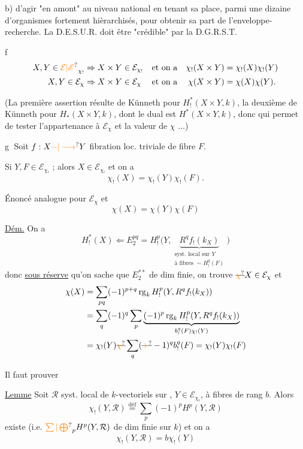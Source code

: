 b) d'agir "en amont" au niveau national en tenant sa place, parmi une dizaine d'organismes fortement hièrarchisés, pour obtenir sa part de l'enveloppe-recherche. La D.E.S.U.R. doit être "crédible" par la D.G.R.S.T.



\textcircled{f}
\[
\begin{aligned}
X,Y\in\unsure{\mathcal E|\mathscr E}_{\chi_!}&\Rightarrow X\times Y\in\mathcal E_{\chi_!} &&\text{et on a} &\chi_!(X\times Y)&=\chi_!(X)\chi_!(Y)\\
X,Y\in\mathcal E_\chi&\Rightarrow X\times Y\in\mathcal E_\chi &&\text{et on a} &\chi(X\times Y)&=\chi(X)\chi(Y).
\end{aligned}
\]

(La première assertion résulte de Künneth pour $H^*_!(X\times Y,k)$, la deuxième de Künneth pour $H_*(X\times Y,k)$, dont le dual est $H^*(X\times Y,k)$, donc qui permet de tester l'appartenance à $\mathcal E_\chi$ et la valeur de $\chi$ $\ldots$)

\textcircled{g} Soit $f:X\unsure{-|\longrightarrow}Y$ fibration loc. triviale de fibre $F$.

Si $Y,F\in\mathcal E_{\chi_!}$ ; alors $X\in\mathcal E_{\chi_!}$ et on a
\[
\chi_!(X)=\chi_!(Y)\chi_!(F).
\]

Énoncé analogue pour  $\mathcal E_\chi$ et 
\[
\chi(X)=\chi(Y)\chi(F)
\]

\uline{Dém.} On a
\[
H^*_!(X)\Leftarrow E_2^{pq}=H^p_!\bigl(Y,\underbrace{R^q f_!(k_X)}_{\substack{\text{syst. local sur }Y\\\text{à fibres }\sim H^q_!(F)}}\bigr)
\]
donc \uline{sous réserve} qu'on sache que $E_2^{**}$ de dim finie, on trouve $\deleted{\unsure{\chi}}X\in\mathcal E_\chi$ et
\[
\begin{aligned}
\chi(X)&=\sum_{pq}(-1)^{p+q}\operatorname{rg}_k H^p_!(Y,R^q f_!(k_X))\\
&=\sum_q(-1)^q\sum_p\underbrace{(-1)^p\operatorname{rg}_k H^p_!(Y,R^q f_!(k_X))}_{b^q_!(F)\chi_!(Y)}\\
&=\chi_!(Y)\deleted{\unsure{\chi}}\sum_q(\deleted{\unsure{+}}-1)^q b^q_!(F)=\chi_!(Y)\chi_!(F)
\end{aligned}
\]

Il faut prouver

\uline{Lemme} Soit $\mathcal R$ syst. local de $k$-vectoriels sur , $Y\in\mathcal E_{\chi_!}$, à fibres de rang  $b$. Alors
\[
\chi_!(Y,\mathcal R)\overset{\mathrm{déf}}{=}\sum_p(-1)^p H^p(Y,\mathcal R)
\]
existe (i.e. $\unsure{\sum|\bigoplus}_p H^p(Y,\mathcal R)$ de dim finie sur $k$) et on a
\[
\chi_!(Y,\mathcal R)=b\chi_!(Y)
\]

